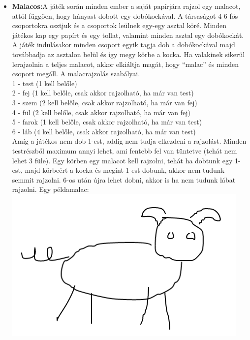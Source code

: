 \documentclass[a4paper, 12pt, twoside, openright]{article}
\begin{document}
\begin{itemize}
\item \textbf{Malacos:}A játék során minden ember a saját papírjára rajzol egy malacot, attól függően, hogy hányast dobott egy dobókockával. A társaságot 4-6 fős csoportokra osztjuk és a csoportok leülnek egy-egy asztal köré. Minden játékos kap egy papírt és egy tollat, valamint minden asztal egy dobókockát. A játék indulásakor minden csoport egyik tagja dob a dobókockával majd továbbadja az asztalon belül és így megy körbe a kocka. Ha valakinek sikerül lerajzolnia a teljes malacot, akkor elkiáltja magát, hogy ``malac'' és minden csoport megáll. A malacrajzolás szabályai. \\
1 - test (1 kell belőle)\\
2 - fej (1 kell belőle, csak akkor rajzolható, ha már van test)\\
3 - szem (2 kell belőle, csak akkor rajzolható, ha már van fej)\\
4 - fül (2 kell belőle, csak akkor rajzolható, ha már van fej)\\
5 - farok (1 kell belőle, csak akkor rajzolható, ha már van test)\\
6 - láb (4 kell belőle, csak akkor rajzolható, ha már van test)\\
Amíg a játékos nem dob 1-est, addig nem tudja elkezdeni a rajzolást. Minden testrészből maximum annyi lehet, ami fentebb fel van tüntetve (tehát nem lehet 3 füle). Egy körben egy malacot kell rajzolni, tehát ha dobtunk egy 1-est, majd körbeért a kocka és megint 1-est dobunk, akkor nem tudunk semmit rajzolni. 6-os után újra lehet dobni, akkor is ha nem tudunk lábat rajzolni. Egy példamalac:\\
\includegraphics[scale=0.65]{malac.png}\\

\end{itemize}
\end{document}
